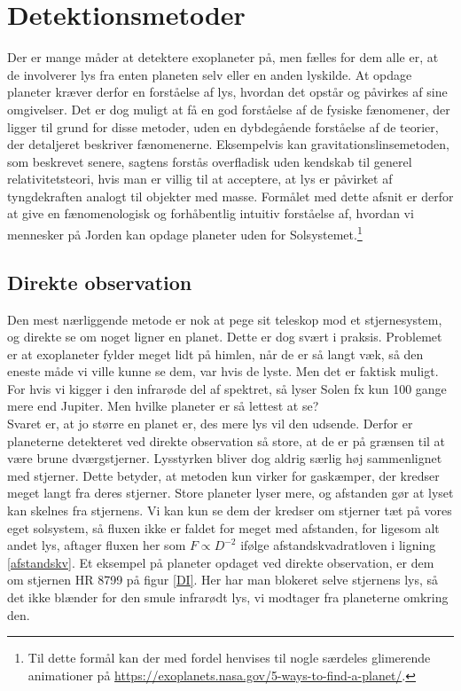 \section{Detektionsmetoder}
Der er mange måder at detektere exoplaneter på, men fælles for dem alle er, at de involverer lys fra enten planeten selv eller en anden lyskilde. At opdage planeter kræver derfor en forståelse af lys, hvordan det opstår og påvirkes af sine omgivelser. Det er dog muligt at få en god forståelse af de fysiske fænomener, der ligger til grund for disse metoder, uden en dybdegående forståelse af de teorier, der detaljeret beskriver fænomenerne. Eksempelvis kan gravitationslinsemetoden, som beskrevet senere, sagtens forstås overfladisk uden kendskab til generel relativitetsteori, hvis man er villig til at acceptere, at lys er påvirket af tyngdekraften analogt til objekter med masse. Formålet med dette afsnit er derfor at give en fænomenologisk og forhåbentlig intuitiv forståelse af, hvordan vi mennesker på Jorden kan opdage planeter uden for Solsystemet.\footnote{Til dette formål kan der med fordel henvises til nogle særdeles glimerende animationer på \url{https://exoplanets.nasa.gov/5-ways-to-find-a-planet/}.}

\subsection*{Direkte observation}

Den mest nærliggende metode er nok at pege sit teleskop mod et stjernesystem, og direkte se om noget ligner en planet. Dette er dog svært i praksis. Problemet er at exoplaneter fylder meget lidt på himlen, når de er så langt væk, så den eneste måde vi ville kunne se dem, var hvis de lyste. Men det er faktisk muligt. For hvis vi kigger i den infrarøde del af spektret, så lyser Solen fx kun 100 gange mere end Jupiter. %
Men hvilke planeter er så lettest at se? \\
Svaret er, at jo større en planet er, des mere lys vil den udsende. Derfor er planeterne detekteret ved direkte observation så store, at de er på grænsen til at være brune dværgstjerner. %
%
%
Lysstyrken bliver dog aldrig særlig høj sammenlignet med stjerner. Dette betyder, at metoden kun virker for gaskæmper, der kredser meget langt fra deres stjerner. Store planeter lyser mere, og afstanden gør at lyset kan skelnes fra stjernens. Vi kan kun se dem der kredser om stjerner tæt på vores eget solsystem, så fluxen ikke er faldet for meget med afstanden, for ligesom alt andet lys, aftager fluxen her som $F\propto D^{-2}$ ifølge afstandskvadratloven i ligning \eqref{afstandskv}. %
%
Et eksempel på planeter opdaget ved direkte observation, er dem om stjernen HR 8799 på figur \ref{DI}. Her har man blokeret selve stjernens lys, så det ikke blænder for den smule infrarødt lys, vi modtager fra planeterne omkring den.

